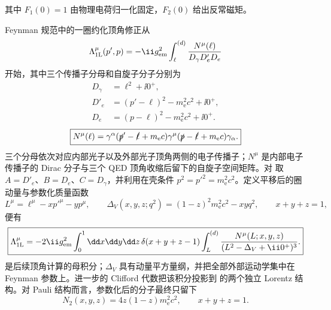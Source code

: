 其中 \(F_1(0)=1\) 由物理电荷归一化固定，\(F_2(0)\) 给出反常磁矩。

Feynman 规范中的一圈约化顶角修正从
\begin{equation}
 \Lambda_{\rm 1L}^\mu(p',p)
 =-\ii g_{\rm em}^2
 \int_{\ell}^{(d)}
 \frac{N^\mu(\ell)}{D_\gamma D'_eD_e}
 \label{eq:vertex-loop-start-r14}
\end{equation}
开始，其中三个传播子分母和自旋子分子分别为
\begin{equation}
\boxed{
\begin{aligned}
D_\gamma&=\ell^2+\ii0^+,\\
D'_e&=(p'-\ell)^2-m_{\mathrm e}^2c^2+\ii0^+,\\
D_e&=(p-\ell)^2-m_{\mathrm e}^2c^2+\ii0^+.
\end{aligned}}
\label{eq:vertex-propagator-denominators-dp75}
\end{equation}
\begin{equation}
\boxed{
N^\mu(\ell)=\gamma^\alpha
(\slashed p'-\slashed\ell+m_{\mathrm e} c)\gamma^\mu
(\slashed p-\slashed\ell+m_{\mathrm e} c)\gamma_\alpha.}
\label{eq:vertex-loop-numerator-dp75}
\end{equation}
三个分母依次对应内部光子以及外部光子顶角两侧的电子传播子；$N^\mu$ 是内部电子传播子的 Dirac 分子与三个 QED 顶角收缩后留下的自旋子空间矩阵。对 取
$A=D'_e$、$B=D_e$、$C=D_\gamma$，并利用在壳条件
$p^2=p'^2=m_{\mathrm e}^2c^2$。定义平移后的圈动量与参数化质量函数
\begin{equation}
\boxed{
L^\mu=\ell^\mu-xp'^\mu-yp^\mu,\qquad
\Delta_V(x,y,z;q^2)=(1-z)^2m_{\mathrm e}^2c^2-xyq^2,\qquad x+y+z=1,}
\label{eq:vertex-shift-delta-dp75}
\end{equation}
便有
\begin{equation}
\boxed{
\Lambda_{\rm 1L}^\mu
=-2\ii g_{\rm em}^2
\int_0^1\dd x\dd y\dd z\,
\delta(x+y+z-1)
\int_L^{(d)}
\frac{N^\mu(L;x,y,z)}{(L^2-\Delta_V+\ii0^+)^3}.}
\label{eq:vertex-parameterized-mother-dp75}
\end{equation}
 是后续顶角计算的母积分；$\Delta_V$ 具有动量平方量纲，并把全部外部运动学集中在 Feynman 参数上。进一步的 Clifford 代数把该积分投影到 的两个独立 Lorentz 结构。对 Pauli 结构而言，参数化后的分子最终只留下
\begin{equation}
 \boxed{N_2(x,y,z)=4z(1-z)m_{\mathrm e}^2c^2,\qquad x+y+z=1.}
 \label{eq:vertex-pauli-numerator-r68}
\end{equation}


